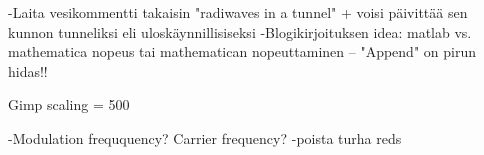 -Laita vesikommentti takaisin "radiwaves in a tunnel" + voisi päivittää sen kunnon tunneliksi eli uloskäynnillisiseksi
-Blogikirjoituksen idea: matlab vs. mathematica nopeus tai mathematican nopeuttaminen – "Append" on pirun hidas!!

Gimp scaling = 500 

-Modulation freququency? Carrier frequency? 
-poista turha reds
